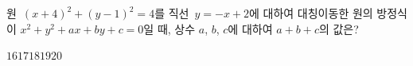 원~$(x+4)^2+(y-1)^2=4$를 직선~$y=-x+2$에 대하여 대칭이동한 원의 방정식이 $x^2+y^2+ax+by+c=0$일 때, 상수 $a$, $b$, $c$에 대하여 $a+b+c$의 값은?
\begin{choices32}{$16$}{$17$}{$18$}{$19$}{$20$}\end{choices32}
